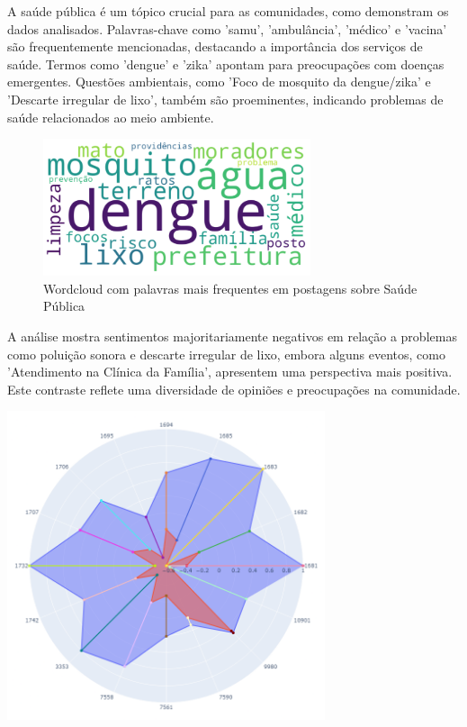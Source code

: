 A saúde pública é um tópico crucial para as comunidades, como demonstram os dados analisados. Palavras-chave como 'samu', 'ambulância', 'médico' e 'vacina' são frequentemente mencionadas, destacando a importância dos serviços de saúde. Termos como 'dengue' e 'zika' apontam para preocupações com doenças emergentes. Questões ambientais, como 'Foco de mosquito da dengue/zika' e 'Descarte irregular de lixo', também são proeminentes, indicando problemas de saúde relacionados ao meio ambiente.

\begin{figure}[htb]
	\centering
	\includegraphics[width=0.7\textwidth]{images/wordcloud_public_health.png}
	\caption{Wordcloud com palavras mais frequentes em postagens sobre Saúde Pública}
	\label{fig:wordcloud_public_health}
\end{figure}

A análise mostra sentimentos majoritariamente negativos em relação a problemas como poluição sonora e descarte irregular de lixo, embora alguns eventos, como 'Atendimento na Clínica da Família', apresentem uma perspectiva mais positiva. Este contraste reflete uma diversidade de opiniões e preocupações na comunidade.

\begin{quadro}[htb]
	\centering
	\includegraphics[width=0.7\textwidth]{images/social_barometer_public_health.png}
	\caption{Gráfico de Radar ilustrando a pressão social em relação ao tópico de Saúde Pública.}
	\label{fig:social_barometer_public_health}
\end{quadro}

